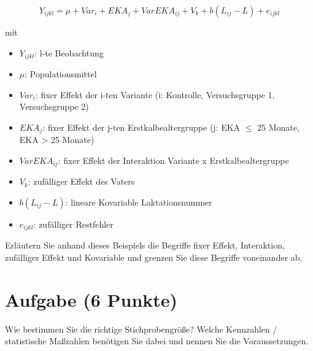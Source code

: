\documentclass[a4paper, 9pt]{scrartcl}\usepackage[]{graphicx}\usepackage[]{xcolor}
\begin{document}
\begin{equation*}
  Y_{ijkl} = \mu + Var_i + EKA_j + VarEKA_{ij} + V_k + b(L_{ij} - L) + e_{ijkl}
\end{equation*}

mit

\begin{itemize}
\item $Y_{ijkl}$: l-te Beobachtung
\item $\mu$: Populationsmittel 
\item $Var_i$: fixer Effekt der i-ten Variante (i: Kontrolle,
  Versuchsgruppe 1, Versuchsgruppe 2)
\item $EKA_j$: fixer Effekt der j-ten Erstkalbealtergruppe (j: EKA $\leq$ 25
  Monate, EKA > 25 Monate)
\item $VarEKA_{ij}$: fixer Effekt der Interaktion Variante x
  Erstkalbealtergruppe 
\item $V_k$: zuf{\"a}lliger Effekt des Vaters 
\item $b(L_{ij} - L)$: lineare Kovariable Laktationsnummer 
\item $e_{ijkl}$: zuf{\"a}lliger
  Restfehler
\end{itemize}
Erl{\"a}utern Sie anhand dieses Beispiels die Begriffe fixer Effekt,
Interaktion, zuf{\"a}lliger Effekt und Kovariable und grenzen Sie diese
Begriffe voneinander ab.



\section{Aufgabe \hfill (6 Punkte)}
Wie bestimmen Sie die richtige Stichprobengr{\"o}{\ss}e? Welche Kennzahlen /
statistische Ma{\ss}zahlen ben{\"o}tigen Sie dabei und nennen Sie die
Voraussetzungen.

 
\end{document}
